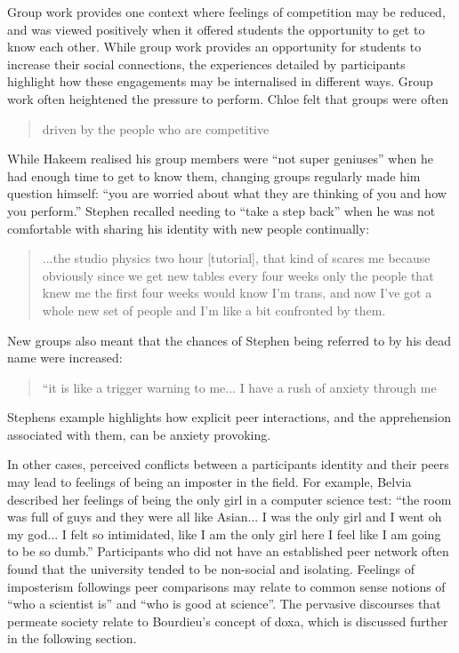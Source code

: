 Group work provides one context where feelings of competition may be reduced, and was viewed positively when it offered students the opportunity to get to know each other. While group work provides an opportunity for students to increase their social connections, the experiences detailed by participants highlight how these engagements may be internalised in different ways. Group work often heightened the pressure to perform. Chloe felt that groups were often \blockquote{driven by the people who are competitive}. While Hakeem realised his group members were ``not super geniuses'' when he had enough time to get to know them, changing groups regularly made him question himself: ``you are worried about what they are thinking of you and how you perform.'' Stephen recalled needing to ``take a step back'' when he was not comfortable with sharing his identity with new people continually: \blockquote{...the studio physics two hour [tutorial], that kind of scares me because obviously since we get new tables every four weeks only the people that knew me the first four weeks would know I'm trans, and now I've got a whole new set of people and I’m like a bit confronted by them.} New groups also meant that the chances of Stephen being referred to by his dead name were increased: \blockquote{``it is like a trigger warning to me... I have a rush of anxiety through me} Stephens example highlights how explicit peer interactions, and the apprehension associated with them, can be anxiety provoking. 

In other cases, perceived conflicts between a participants identity and their peers may lead to feelings of being an imposter in the field. For example, Belvia described her feelings of being the only girl in a computer science test: ``the room was full of guys and they were all like Asian... I was the only girl and I went oh my god... I felt so intimidated, like I am the only girl here I feel like I am going to be so dumb.'' Participants who did not have an established peer network often found that the university tended to be non-social and isolating. Feelings of imposterism followings peer comparisons may relate to common sense notions of ``who a scientist is'' and ``who is good at science''. The pervasive discourses that permeate society relate to Bourdieu's concept of doxa, which is discussed further in the following section.

